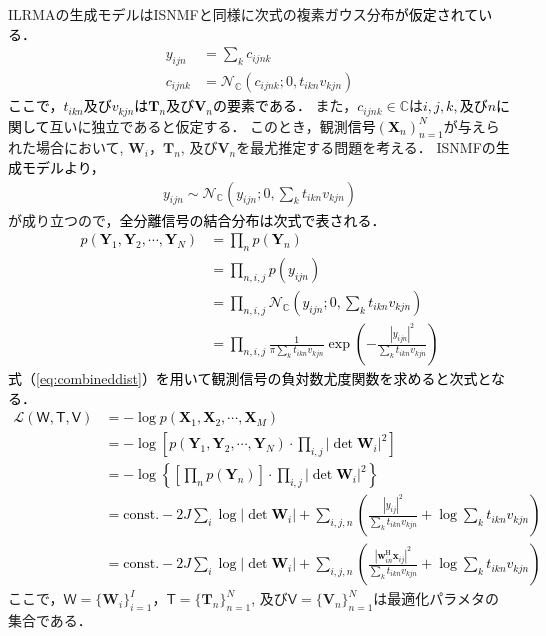 ILRMAの生成モデルはISNMFと同様に次式の複素ガウス分布\textcolor{black}{が仮定されている．}
\begin{align}
    y_{ijn} &= \sum_k c_{ijnk} \\
    c_{ijnk} &= \mathcal{N}_{\mathbb{C}}(c_{ijnk}; 0, t_{ikn} v_{kjn}) \label{eq:ilrma_gen}
\end{align}
\textcolor{black}{ここで，$t_{ikn}$及び$v_{kjn}$は$\bm{T}_n$及び$\bm{V}_n$の要素である．}
また，$c_{ijnk} \in \mathbb{C}$は\textcolor{black}{$i, j, k, $及び$n$に関して}互いに独立であると仮定する．
このとき，観測\textcolor{black}{信号$(\bm{X}_n)_{n=1}^N$}が与えられた場合において, $\bm{W}_i$，$\bm{T}_n$, 及び$\bm{V}_n$を最尤推定する問題を考える．
ISNMFの\textcolor{black}{生成モデルより，}
\begin{align}
    y_{ijn} \sim \mathcal{N}_{\mathbb{C}}\left(y_{ijn};  0, \sum_k t_{ikn} v_{kjn} \right) 
　　\label{eq:ISNMFmodel}
\end{align}
が成り立つので，\textcolor{black}{全分離信号の結合分布は次式で表される．}
\textcolor{black}{
\begin{align}
    \nonumber p(\bm{Y}_1, \bm{Y}_2, \cdots, \bm{Y}_N) &= \prod_n p(\bm{Y}_n) \\
\nonumber &= \prod_{n, i, j} p(y_{ijn}) \\
\nonumber &= \prod_{n, i, j} \mathcal{N}_{\mathbb{C}} \left(y_{ijn}; 0, \sum_k t_{ikn}v_{kjn} \right) \\
&= \prod_{n, i, j} \frac{1}{\pi \sum_k t_{ikn}v_{kjn}} \exp \left( -\frac{|y_{ijn}|^2}{\sum_k t_{ikn}v_{kjn}} \right) \label{eq:combineddist}
\end{align}}
\textcolor{black}{式（\ref{eq:combineddist}）を用いて観測信号の負対数尤度関数を求めると次式となる．}
\textcolor{black}{
\begin{align}
　　\nonumber \mathcal{L}(\mathsf{W, T, V}) &= - \log p(\bm{X}_1, \bm{X}_2, \cdots, \bm{X}_M) \\
    \nonumber &= -\log \left[p(\bm{Y}_1, \bm{Y}_2, \cdots, \bm{Y}_N) \cdot \prod_{i, j} |\det \bm{W}_i|^2\right] \\
    \nonumber &= -\log \left \{ \left[\prod_n p(\bm{Y}_n) \right] \cdot \prod_{i, j} |\det \bm{W}_i|^2\right \} \\
    \nonumber &= \mathrm{const.}- 2J \sum_{i}  \log |\det \bm{W}_i| +\sum_{i,j,n} \left( \frac{|y_{ij}|^2}{\sum_k t_{ikn} v_{kjn}} + \log \sum_k t_{ikn} v_{kjn}\right) \\
    &= \mathrm{const.}-2J \sum_i \log | \det \bm{W}_i | + \sum_{i,j,n} \left( \frac{|\bm{w}_{in}^{\mathrm{H}}\bm{x}_{ij}|^2}{\sum_k t_{ikn}v_{kjn}} + \log \sum_k t_{ikn}v_{kjn} \right)
    \label{eq:ilrmalike2}
\end{align}}
ここで，$\mathsf{W}=\{ \bm{W}_i \}_{i=1}^I$，$\mathsf{T}=\{ \bm{T}_n \}_{n=1}^N$, 及び$\mathsf{V}=\{ \bm{V}_n \}_{n=1}^N$は最適化パラメタの集合である．

